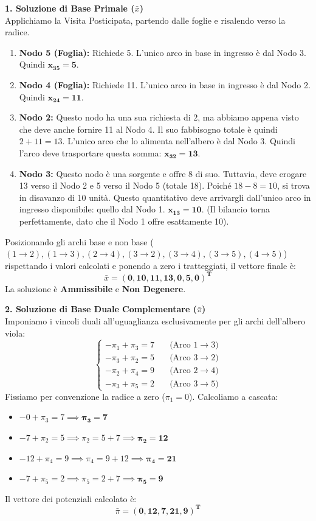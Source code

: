 \documentclass[12pt, a4paper]{article}
\begin{document}
	\vspace{0.4cm}
	\textbf{1. Soluzione di Base Primale ($\bar{x}$)}\\
	Applichiamo la Visita Posticipata, partendo dalle foglie e risalendo verso la radice.
	\begin{enumerate}
		\item \textbf{Nodo 5 (Foglia):} Richiede 5. L'unico arco in base in ingresso è dal Nodo 3. Quindi $\mathbf{x_{35} = 5}$.
		\item \textbf{Nodo 4 (Foglia):} Richiede 11. L'unico arco in base in ingresso è dal Nodo 2. Quindi $\mathbf{x_{24} = 11}$.
		\item \textbf{Nodo 2:} Questo nodo ha una sua richiesta di 2, ma abbiamo appena visto che deve anche fornire 11 al Nodo 4. Il suo fabbisogno totale è quindi $2 + 11 = 13$. L'unico arco che lo alimenta nell'albero è dal Nodo 3. Quindi l'arco deve trasportare questa somma: $\mathbf{x_{32} = 13}$.
		\item \textbf{Nodo 3:} Questo nodo è una sorgente e offre 8 di suo. Tuttavia, deve erogare 13 verso il Nodo 2 e 5 verso il Nodo 5 (totale 18). Poiché $18 - 8 = 10$, si trova in disavanzo di 10 unità. Questo quantitativo deve arrivargli dall'unico arco in ingresso disponibile: quello dal Nodo 1. $\mathbf{x_{13} = 10}$. (Il bilancio torna perfettamente, dato che il Nodo 1 offre esattamente 10).
	\end{enumerate}
	
	Posizionando gli archi base e non base ($(1\to2), (1\to3), (2\to4), (3\to2), (3\to4), (3\to5), (4\to5)$) rispettando i valori calcolati e ponendo a zero i tratteggiati, il vettore finale è:
	\[ \bar{x} = \mathbf{(0, 10, 11, 13, 0, 5, 0)^T} \]
	La soluzione è \textbf{Ammissibile} e \textbf{Non Degenere}.
	
	\vspace{0.4cm}
	\textbf{2. Soluzione di Base Duale Complementare ($\bar{\pi}$)}\\
	Imponiamo i vincoli duali all'uguaglianza esclusivamente per gli archi dell'albero viola:
	\[
	\begin{cases}
		-\pi_1 + \pi_3 = 7 \quad &\text{(Arco } 1\to3) \\
		-\pi_3 + \pi_2 = 5 \quad &\text{(Arco } 3\to2) \\
		-\pi_2 + \pi_4 = 9 \quad &\text{(Arco } 2\to4) \\
		-\pi_3 + \pi_5 = 2 \quad &\text{(Arco } 3\to5)
	\end{cases}
	\]
	Fissiamo per convenzione la radice a zero ($\pi_1 = 0$). Calcoliamo a cascata:
	\begin{itemize}[label=$\circ$, itemsep=2pt, leftmargin=1.5cm]
		\item $-0 + \pi_3 = 7 \implies \mathbf{\pi_3 = 7}$
		\item $-7 + \pi_2 = 5 \implies \pi_2 = 5 + 7 \implies \mathbf{\pi_2 = 12}$
		\item $-12 + \pi_4 = 9 \implies \pi_4 = 9 + 12 \implies \mathbf{\pi_4 = 21}$
		\item $-7 + \pi_5 = 2 \implies \pi_5 = 2 + 7 \implies \mathbf{\pi_5 = 9}$
	\end{itemize}
	Il vettore dei potenziali calcolato è:
	\[ \bar{\pi} = \mathbf{(0, 12, 7, 21, 9)^T} \]
	
\end{document}
